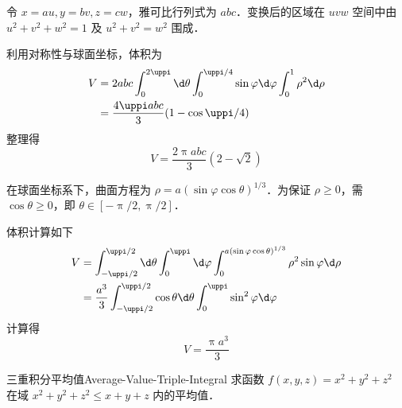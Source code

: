 \begin{solution}
     令 $x = au, y = bv, z = cw$，雅可比行列式为 $abc$．变换后的区域在 $uvw$ 空间中由 $u^2+v^2+w^2=1$ 及 $u^2+v^2=w^2$ 围成．

    利用对称性与球面坐标，体积为
    \begin{equation}
        \begin{aligned}
            V & = 2 abc \int_0^{2\uppi} \d \theta \int_0^{\uppi/4} \sin \varphi \d \varphi \int_0^1 \rho^2 \d \rho \\
              & = \frac{4\uppi abc}{3} (1 - \cos \uppi/4)
        \end{aligned}
    \end{equation}
    整理得
    \begin{equation}
        V = \boxed{\frac{2\uppi abc}{3} (2 - \sqrt{2})}
    \end{equation}

     在球面坐标系下，曲面方程为 $\rho = a (\sin \varphi \cos \theta)^{1/3}$．为保证 $\rho \ge 0$，需 $\cos \theta \ge 0$，即 $\theta \in [-\uppi/2, \uppi/2]$．

    体积计算如下
    \begin{equation}
        \begin{aligned}
            V & = \int_{-\uppi/2}^{\uppi/2} \d \theta \int_0^{\uppi} \d \varphi \int_0^{a(\sin \varphi \cos \theta)^{1/3}} \rho^2 \sin \varphi \d \rho \\
              & = \frac{a^3}{3} \int_{-\uppi/2}^{\uppi/2} \cos \theta \d \theta \int_0^{\uppi} \sin^2 \varphi \d \varphi
        \end{aligned}
    \end{equation}
    计算得
    \begin{equation}
        V = \boxed{\frac{\uppi a^3}{3}}
    \end{equation}
\end{solution}

\begin{problem}{三重积分平均值}{Average-Value-Triple-Integral}
    求函数 $f(x, y, z) = x^2 + y^2 + z^2$ 在域 $x^2 + y^2 + z^2 \le x + y + z$ 内的平均值．
\end{problem}

